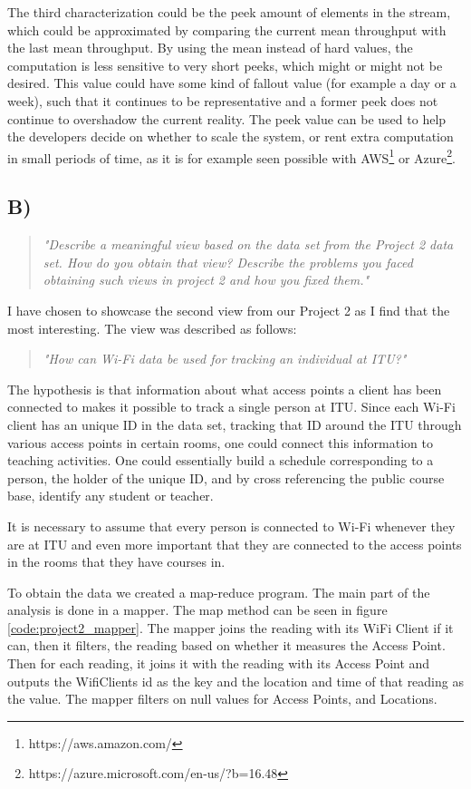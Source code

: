 \newpar The third characterization could be the peek amount of elements in the stream, which could be approximated by comparing the current mean throughput with the last mean throughput. By using the mean instead of hard values, the computation is less sensitive to very short peeks, which might or might not be desired. This value could have some kind of fallout value (for example a day or a week), such that it continues to be representative and a former peek does not continue to overshadow the current reality. The peek value can be used to help the developers decide on whether to scale the system, or rent extra computation in small periods of time, as it is for example seen possible with AWS\footnote{https://aws.amazon.com/} or Azure\footnote{https://azure.microsoft.com/en-us/?b=16.48}.

\subsection{B)}
\begin{quote}
		\textit{"Describe	a	meaningful	view	based	on	the	data	set	from	the	Project	2	data	set.	How	do	you	obtain	that	view?	Describe	the	problems	you	faced	obtaining	such	views	in	project	2	and	how	you	fixed	them."}
\end{quote}
I have chosen to showcase the second view from our Project 2 as I find that the most interesting. The view was described as follows: 
\begin{quote}
	\textit{"How can Wi-Fi data be used for tracking an individual at ITU?"}
\end{quote}
The hypothesis is that information about what access points a client has been connected to makes it possible to track a single person at ITU. Since each Wi-Fi client has an unique ID in the data set, tracking that ID around the ITU through various access points in certain rooms, one could connect this information to teaching activities. One could essentially build a schedule corresponding to a person, the holder of the unique ID, and by cross referencing the public course base, identify any student or teacher. 

It is necessary to assume that every person is connected to Wi-Fi whenever they are at ITU and even more important that they are connected to the access points in the rooms that they have courses in. 

\newpar To obtain the data we created a map-reduce program. The main part of the analysis is done in a mapper. The map method can be seen in figure \ref{code:project2_mapper}. The mapper joins the reading with its WiFi Client if it can, then it filters, the reading based on whether it measures the Access Point. Then for each reading, it joins it with the reading with its Access Point  and outputs the WifiClients id as the key and the location and time of that reading as the value. The mapper filters on null values for Access Points, and Locations.

